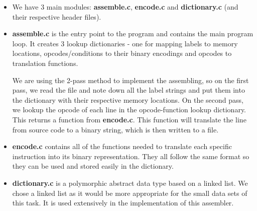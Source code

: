 \documentclass[11pt]{article}
\begin{document}
\begin{itemize}

\item 
We have 3 main modules: \textbf{assemble.c}, \textbf{encode.c} and \textbf{dictionary.c} (and their respective header files).

\item
\textbf{assemble.c} is the entry point to the program and contains the main program loop. It creates 3 lookup dictionaries - one for mapping labels to memory locations, opcodes/conditions to their binary encodings and opcodes to translation functions. 

We are using the 2-pass method to implement the assembling, so on the first pass, we read the file and note down all the label strings and put them into the dictionary with their respective memory locations. On the second pass, we lookup the opcode of each line in the opcode-function lookup dictionary. This returns a function from \textbf{encode.c}. This function will translate the line from source code to a binary string, which is then written to a file.

\item
\textbf{encode.c} contains all of the functions needed to translate each specific instruction into its binary representation. They all follow the same format so they can be used and stored easily in the dictionary.

\item
\textbf{dictionary.c} is a polymorphic abstract data type based on a linked list. We chose a linked list as it would be more appropriate for the small data sets of this task. It is used extensively in the implementation of this assembler.

\end{itemize}
\end{document}
